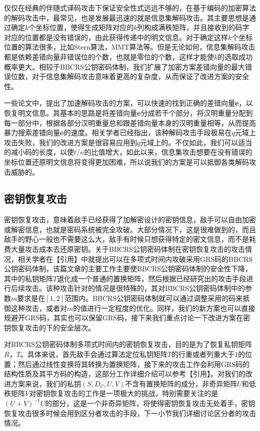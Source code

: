 仅仅在经典的伴随式译码攻击下保证安全性式远远不够的，在基于编码的加密算法的解码攻击中，最常见，也是发展最迅速的就是信息集解码攻击。其主要思想是通过确定$k$个坐标位置，使得生成矩阵对应的$k$列构成满秩矩阵，并且接收到的码字对应的位置都是没有错误的，由此获得传递中的明文信息。对于确定这样$k$个坐标位置的算法很多，比如Stern算法，MMT算法等。但是无论如何，信息集解码攻击都是依赖差错向量非错误位的个数，也就是零位的个数，这样才能使$k$的选取成功概率更大。相较于BBCRS公钥密码体制，我们扩展了加密方案差错向量的最大错误位数，对于信息集解码攻击意味着更高的复杂度，从而保证了改进方案的安全性。

一些论文中，提出了加速解码攻击的方案，可以快速的找到正确的差错向量$\mathbf{e}$，以恢复明文信息。其基本的思路是将差错向量$\mathbf{e}$分成若干个部分，将汉明重量分配到每一部分中，根据各部分汉明重量总和跟差错向量本身的汉明重量相等，从而提高暴力搜索差错向量$\mathbf{e}$的速度。相关学者已经指出，该种解码攻击手段极易在$q$元域上攻击失败，我们的改进方案是很容易应用到$q$元域上的。不仅如此，我们可以适当的减小码的长度，以使$t/n$的比值增大，如此以来，信息集攻击想要在没有错误的坐标位置还原明文信息将变得更加困难，所以说我们的方案是可以抵御各类解码攻击威胁的。

\subsection{密钥恢复攻击}
密钥恢复攻击，意味着敌手已经获得了加解密设计的密钥信息，敌手可以自由加密或解密信息，也就是密码系统被完全攻破。大部分情况下，这是很难做到的，而且敌手的野心一般也不需要这么大，敌手有时候只想获得特定的密文信息，而不是耗费大量攻击成本去还原密钥。关于BBCRS公钥密码体制在密钥恢复攻击的攻击情况，相关学者在【引用】中就提出可以在多项式时间内攻破采用GRS码的BBCRS公钥密码体制，该篇文章的主要工作主要使BBCRS公钥密码体制的安全性下降，其中的私钥矩阵$T$退化成一个普通的置换矩阵，然后根据已经研究出的攻击手段进行后续攻击。该种攻击针对的情况是很特殊的，其对BBCRS公钥密码体制中的参数$m$要求是在$[1, 2]$范围内。BBCRS公钥密码体制就可以通过调整采用的码来抵御这种攻击，或者对$m$的值进行一定程度的优化。同样，我们的新方案也可以直接规避开GRS码，其实也可以保留GRS码，接下来我们重点讨论一下改进方案在密钥恢复攻击的下的安全层次。

对BBCRS公钥密码体制多项式时间内的密钥恢复攻击，目的是为了恢复私钥矩阵$R$，$T$。具体来说，首先敌手会通过算法定位私钥矩阵$T$的行重或者列重大于$1$的位置；然后通过线性变换将其转换为置换矩阵，接下来的攻击工作会利用GRS码的结构性质及其平方码的构造，这部分工作详细介绍可以参考【引用】。对我们的改进方案来说，我们的私钥$(S,D_\mathcal{C},U,V)$不含有置换矩阵的成分，非奇异矩阵$U$和低秩矩阵$V$对密钥恢复攻击的工作是一项极大的挑战，特别需要关注的是$(U+V)^{-1}U$的部分，这是一个非奇异矩阵，将使得密钥恢复攻击无处着手，密钥恢复攻击很多时候会用到区分者攻击的手段，下一小节我们详细讨论区分者的攻击情况。

